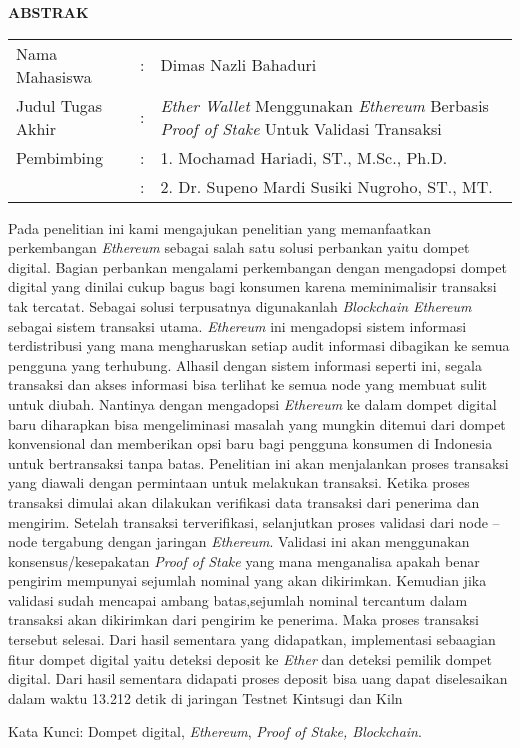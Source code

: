 \begin{center}
  \large\textbf{ABSTRAK}
\end{center}


\vspace{2ex}

\begingroup
  \setlength{\tabcolsep}{0pt}

  \noindent
  \begin{tabularx}{\textwidth}{l >{\centering}m{2em} X}
    Nama Mahasiswa    &:& Dimas Nazli Bahaduri \\

    Judul Tugas Akhir &:&	\emph{Ether Wallet} Menggunakan \emph{Ethereum} Berbasis \emph{Proof of Stake} Untuk Validasi Transaksi \\

    Pembimbing        &:& 1. Mochamad Hariadi, ST., M.Sc., Ph.D. \\
  &:& 2. Dr. Supeno Mardi Susiki Nugroho, ST., MT.
  \end{tabularx}
\endgroup

Pada penelitian ini kami mengajukan penelitian yang memanfaatkan perkembangan \emph{Ethereum} sebagai salah satu solusi perbankan yaitu dompet digital. Bagian perbankan mengalami perkembangan dengan mengadopsi dompet digital yang dinilai cukup bagus bagi konsumen karena meminimalisir transaksi tak tercatat. Sebagai solusi terpusatnya digunakanlah \emph{Blockchain Ethereum} sebagai sistem transaksi utama. \emph{Ethereum} ini mengadopsi sistem informasi terdistribusi yang mana mengharuskan setiap audit informasi dibagikan ke semua pengguna yang terhubung. Alhasil dengan sistem informasi seperti ini, segala transaksi dan akses informasi bisa terlihat ke semua node yang membuat sulit untuk diubah. Nantinya dengan mengadopsi \emph{Ethereum} ke dalam dompet digital baru diharapkan bisa mengeliminasi masalah yang mungkin ditemui dari dompet konvensional dan memberikan opsi baru bagi pengguna konsumen di Indonesia untuk bertransaksi tanpa batas. Penelitian ini akan menjalankan proses transaksi yang diawali dengan permintaan untuk melakukan transaksi. Ketika proses transaksi dimulai akan dilakukan verifikasi data transaksi dari penerima dan mengirim. Setelah transaksi terverifikasi, selanjutkan proses validasi dari node – node tergabung dengan jaringan \emph{Ethereum}. Validasi ini akan menggunakan konsensus/kesepakatan \emph{Proof of Stake} yang mana menganalisa apakah benar pengirim mempunyai sejumlah nominal yang akan dikirimkan. Kemudian jika validasi sudah mencapai ambang batas,sejumlah nominal tercantum dalam transaksi akan dikirimkan dari pengirim ke penerima. Maka proses transaksi tersebut selesai. Dari hasil sementara yang didapatkan, implementasi sebaagian fitur dompet digital yaitu deteksi deposit ke \emph{Ether} dan deteksi pemilik dompet digital. Dari hasil sementara didapati proses deposit bisa uang dapat diselesaikan dalam waktu 13.212 detik di jaringan Testnet Kintsugi dan Kiln

Kata Kunci: Dompet digital, \emph{Ethereum}, \emph{Proof of Stake, Blockchain}. 
